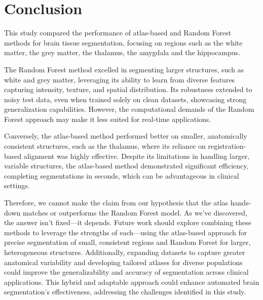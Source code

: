 \section{Conclusion}

This study compared the performance of atlas-based and Random Forest methods for brain tissue segmentation, focusing on regions such as the white matter, the grey matter, the thalamus, the amygdala and the hippocampus. 


The Random Forest method excelled in segmenting larger structures, such as white and grey matter, leveraging its ability to learn from diverse features capturing intensity, texture, and spatial distribution. Its robustness extended to noisy test data, even when trained solely on clean datasets, showcasing strong generalization capabilities. However, the computational demands of the Random Forest approach may make it less suited for real-time applications.

Conversely, the atlas-based method performed better on smaller, anatomically consistent structures, such as the thalamus, where its reliance on registration-based alignment was highly effective. Despite its limitations in handling larger, variable structures, the atlas-based method demonstrated significant efficiency, completing segmentations in seconds, which can be advantageous in clinical settings.

Therefore, we cannot make the claim from our hypothesis that the atlas hands-down matches or outperforms the Random Forest model. As we've discovered, the answer isn't fixed—it depends. Future work should explore combining these methods to leverage the strengths of each—using the atlas-based approach for precise segmentation of small, consistent regions and Random Forest for larger, heterogeneous structures. Additionally, expanding datasets to capture greater anatomical variability and developing tailored atlases for diverse populations could improve the generalizability and accuracy of segmentation across clinical applications. This hybrid and adaptable approach could enhance automated brain segmentation's effectiveness, addressing the challenges identified in this study.